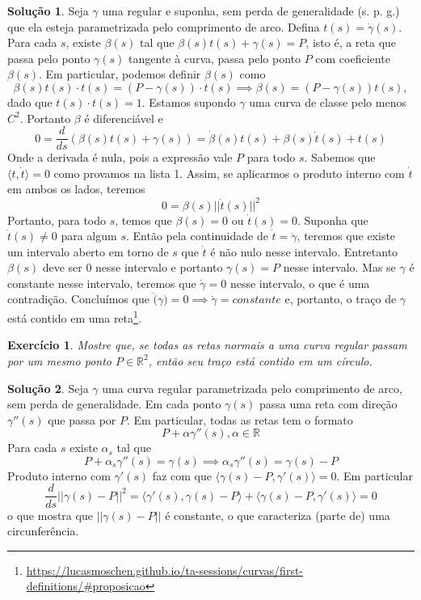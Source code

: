 \documentclass[a4paper,12pt]{article}
\newcommand{\R}{\mathbb{R}}
\theoremstyle{exer}
\newtheorem{exercise}{Exercício}
\theoremstyle{definition}
\newtheorem{solution}{Solução}
\theoremstyle{plain}
\begin{document}
\begin{solution}
    Seja $\gamma$ uma regular e suponha, sem perda de generalidade (s. p. g.)
    que ela esteja parametrizada pelo comprimento de arco. Defina $t(s ) =
    \dot{\gamma}(s)$. Para cada $s$,
    existe $\beta(s)$ tal que $\beta(s)t(s) + \gamma(s) = P$, isto
    é, a reta que passa pelo ponto $\gamma(s)$ tangente à curva, passa pelo
    ponto $P$ com coeficiente $\beta(s)$. Em particular, podemos definir 
    $\beta(s)$ como 
    $$
    \beta(s)t(s)\cdot t(s) = (P - \gamma(s))\cdot t(s) \implies \beta(s) = (P - \gamma(s))t(s),
    $$
    dado que $t(s)\cdot t(s) = 1$. Estamos supondo $\gamma$ uma curva de
    classe pelo menos $C^2$. Portanto $\beta$ é diferenciável e 
    $$
    0 = \frac{d}{ds}(\beta(s)t(s) + \gamma(s)) = \dot{\beta}(s)t(s) + \beta(s)\dot{t}(s) + t(s)
    $$
    Onde a derivada é nula, pois a expressão vale $P$ para todo $s$.
    Sabemos que $\langle t, \dot{t} \rangle = 0$ como provamos na lista 1.
    Assim, se aplicarmos o produto interno com $\dot{t}$ em ambos os lados,
    teremos 
    $$
    0 = \beta(s)||\dot{t}(s)||^2
    $$
    Portanto, para todo $s$, temos que $\beta(s) = 0$ ou $\dot{t}(s) = 0$.
    Suponha que $\dot{t}(s) \neq 0$ para algum $s$. Então pela continuidade
    de $\dot{t} = \ddot{\gamma}$, teremos que existe um intervalo aberto em
    torno de $s$ que $\dot{t}$ é não nulo nesse intervalo. Entretanto
    $\beta(s)$ deve ser 0 nesse intervalo e portanto $\gamma(s) = P$ nesse
    intervalo. Mas se $\gamma$ é constante nesse intervalo, teremos que
    $\dot{\gamma} = 0$ nesse intervalo, o que é uma contradição. Concluímos
    que $\ddot(\gamma) = 0 \implies \dot{\gamma} = constante$ e, portanto,
    o traço de $\gamma$ está contido em uma reta\footnote{\url{https://lucasmoschen.github.io/ta-sessions/curvas/first-definitions/\#proposicao}}. 
\end{solution}

\begin{exercise}
    Mostre que, se todas as retas normais a uma curva regular passam por um
    mesmo ponto $P \in \R^2$, então seu traço está contido em um círculo.
\end{exercise}

\begin{solution}
    Seja $\gamma$ uma curva regular parametrizada pelo comprimento de arco,
    sem perda de generalidade. Em cada ponto $\gamma(s)$ passa uma reta
    com direção $\gamma ''(s)$ que passa por $P$. Em particular, todas as
    retas tem o formato 
    $$
    P + \alpha\gamma ''(s), \alpha \in \R
    $$
    Para cada $s$ existe $\alpha_s$ tal que 
    $$
    P + \alpha_s\gamma ''(s) = \gamma(s) \implies \alpha_s\gamma ''(s) = \gamma(s) - P
    $$
    Produto interno com $\gamma '(s)$ faz com que $\langle \gamma(s) - P, \gamma '(s) \rangle = 0$.
    Em particular 
    $$
    \frac{d}{ds}||\gamma(s) - P||^2 = \langle \gamma '(s), \gamma(s) - P \rangle + \langle \gamma(s) - P, \gamma '(s) \rangle = 0 
    $$
    o que mostra que $||\gamma(s) - P||$ é constante, o que caracteriza (parte
    de) uma circunferência.
\end{solution}
\end{document}
